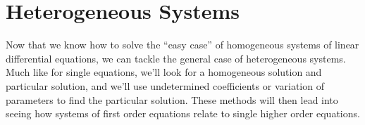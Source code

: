 \section{Heterogeneous Systems}
\noindent
Now that we know how to solve the ``easy case'' of homogeneous systems of linear differential equations, we can tackle the general case of heterogeneous systems.
Much like for single equations, we'll look for a homogeneous solution and particular solution, and we'll use undetermined coefficients or variation of parameters to find the particular solution.
These methods will then lead into seeing how systems of first order equations relate to single higher order equations.


